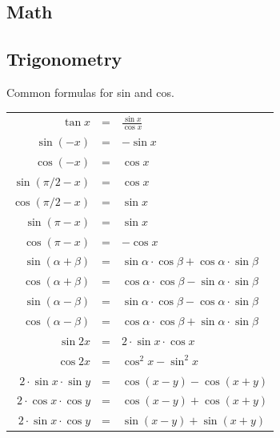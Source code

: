 \documentclass[8pt,a4paper,landscape,oneside]{amsart}
\begin{document}
\begin{multicols*}{3}
\thispagestyle{fancy}
\vspace{-3em}

\tableofcontents

\section{Math}
  \subsection{Trigonometry}
  Common formulas for sin and cos.
  \begin{center}
  \begin{tabular}{rcl}
  \hline
  $\tan x$ & = & $\frac{\sin x}{\cos x}$ \\
  $\sin(-x)$ & = & $-\sin x$ \\
  $\cos(-x)$ & = & $\cos x$ \\
  $\sin(\pi/2-x)$ & = & $\cos x$ \\
  $\cos(\pi/2-x)$ & = & $\sin x$ \\
  $\sin(\pi-x)$ & = & $\sin x$ \\
  $\cos(\pi-x)$ & = & $-\cos x$ \\
  \hline
  $\sin(\alpha+\beta)$ & = & $\sin\alpha \cdot \cos\beta + \cos\alpha \cdot \sin\beta$ \\
  $\cos(\alpha+\beta)$ & = & $\cos\alpha \cdot \cos\beta - \sin\alpha \cdot \sin\beta$ \\
  $\sin(\alpha-\beta)$ & = & $\sin\alpha \cdot \cos\beta - \cos\alpha \cdot \sin\beta$ \\
  $\cos(\alpha-\beta)$ & = & $\cos\alpha \cdot \cos\beta + \sin\alpha \cdot \sin\beta$ \\
  \hline
  $\sin 2x$ & = & $2 \cdot \sin x \cdot \cos x$ \\
  $\cos 2x$ & = & $\cos^2 x - \sin^2 x$ \\
  $2 \cdot \sin x \cdot \sin y$ & = & $\cos(x-y) - \cos(x+y)$ \\
  $2 \cdot \cos x \cdot \cos y$ & = & $\cos(x-y) + \cos(x+y)$ \\
  $2 \cdot \sin x \cdot \cos y$ & = & $\sin(x-y) + \sin(x+y)$ \\ \hline
  \end{tabular}
  \end{center}


\end{multicols*}
\end{document}
